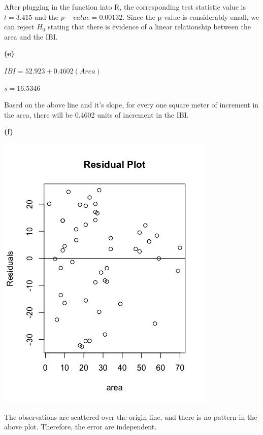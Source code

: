 \documentclass[11pt]{article}
\renewcommand\part[1]{\vspace{.10in}\textbf{(#1)}\par}
\begin{document}
		After plugging in the function into R, the corresponding test statistic value is $t=3.415$ and the $p-value=0.00132$. Since the p-value is considerably small, we can reject $H_{0}$ stating that there is evidence of a linear relationship between the area and the IBI.\par
	
	\part{e}
		$IBI = 52.923 + 0.4602(Area)$\par
		$s=16.5346$\par
		Based on the above line and it's slope, for every one square meter of increment in the area, there will be 0.4602 units of increment in the IBI.\par
	
	\part{f}
		\begin{center}
			\includegraphics[scale=0.5]{images/resplot.png}
		\end{center}\par
		The observations are scattered over the origin line, and there is no pattern in the above plot. Therefore, the error are independent.\par
	
\end{document}
